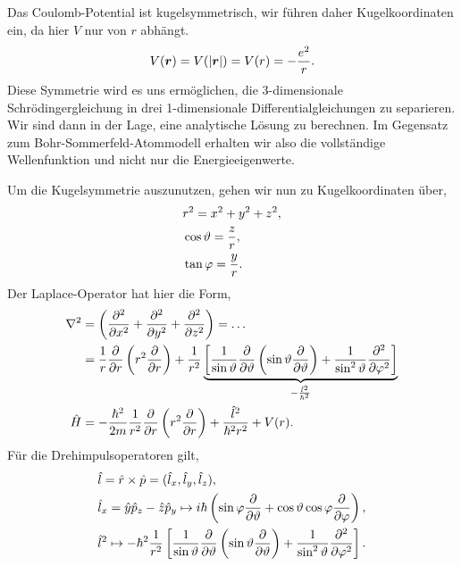 Das Coulomb-Potential ist kugelsymmetrisch, wir führen daher Kugelkoordinaten
ein, da hier $V$ nur von $r$ abhängt.
\begin{align*}
V(\bm{r}) = V(\left|\bm{r}\right|) = V(r) = -\frac{e^2}{r}.
\end{align*}
Diese Symmetrie wird es uns ermöglichen,
die 3-dimensionale Schrödingergleichung in drei 1-dimensionale
Differentialgleichungen zu separieren. Wir sind dann in der Lage, eine
analytische Lösung zu berechnen. Im Gegensatz zum Bohr-Sommerfeld-Atommodell
erhalten wir also die vollständige Wellenfunktion und nicht nur die
Energieeigenwerte.

Um die Kugelsymmetrie auszunutzen, gehen wir nun zu Kugelkoordinaten über,
\begin{align*}
&r^2 = x^2+y^2+z^2,\\
&\cos\vartheta = \frac{z}{r},\\
&\tan\varphi = \frac{y}{r}.
\end{align*}
Der Laplace-Operator hat hier die Form,
\begin{align*}
\nabla^2 &= \left(\frac{\partial^2}{\partial x^2}+\frac{\partial^2}{\partial
y^2}+\frac{\partial^2}{\partial z^2}\right) = \ldots\\
&= \frac{1}{r}\frac{\partial}{\partial r}\left(r^2\frac{\partial}{\partial
r}\right) +
\frac{1}{r^2}\underbrace{\left[\frac{1}{\sin\vartheta}\frac{\partial}{\partial\vartheta}\left(\sin\vartheta
\frac{\partial}{\partial\vartheta}\right) +
\frac{1}{\sin^2\vartheta}\frac{\partial^2}{\partial \varphi^2}
\right]}_{-\frac{\hat{\boldmath{l}}^2}{\hbar^2}}\\
\hat{\boldmath{H}} &= -\frac{\hbar^2}{2m}\frac{1}{r^2}\frac{\partial}{\partial
r}\left(r^2\frac{\partial}{\partial r}\right)+\frac{\hat{\boldmath{l}}^2}{\hbar^2r^2} +
V(r).
\end{align*}
Für die Drehimpulsoperatoren gilt,
\begin{align*}
&\hat{\boldmath{l}} =\hat{\boldmath{r}}\times\hat{\boldmath{p}} = (\hat{\boldmath{l}}_x,\hat{\boldmath{l}}_y,\hat{\boldmath{l}}_z),\\
&\hat{\boldmath{l}}_x = \hat{\boldmath{y}}\hat{\boldmath{p}}_z - \hat{\boldmath{z}}\hat{\boldmath{p}}_y \mapsto i\hbar
\left(\sin\varphi\frac{\partial}{\partial \vartheta} +
\cos\vartheta\cos\varphi\frac{\partial}{\partial \varphi}\right),\\
&\hat{\boldmath{l}}^2 \mapsto
-\hbar^2\frac{1}{r^2}\left[\frac{1}{\sin\vartheta}\frac{\partial}{\partial\vartheta}\left(\sin\vartheta
\frac{\partial}{\partial\vartheta}\right) +
\frac{1}{\sin^2\vartheta}\frac{\partial^2}{\partial \varphi^2}
\right].
\end{align*}
